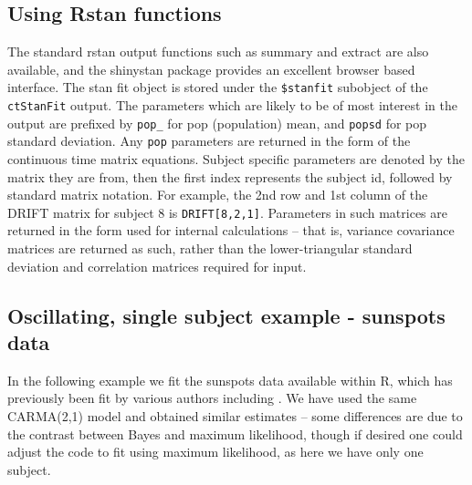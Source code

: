 \documentclass[11pt]{article}\usepackage[]{graphicx}\usepackage[]{color}
\begin{document}
{{{\subsection{Using Rstan functions}
The standard rstan output functions such as summary and extract are also available, and the shinystan package provides an excellent browser based interface. The stan fit object is stored under the \verb|$stanfit| subobject of the \verb|ctStanFit| output. The parameters which are likely to be of most interest in the output are prefixed by \verb|pop_| for pop (population) mean, and \verb|popsd| for pop standard deviation. Any \verb|pop| parameters are returned in the form of the continuous time matrix equations. Subject specific parameters are denoted by the matrix they are from, then the first index represents the subject id, followed by standard matrix notation. For example, the 2nd row and 1st column of the DRIFT matrix for subject 8 is \verb|DRIFT[8,2,1]|. Parameters in such matrices are returned in the form used for internal calculations -- that is, variance covariance matrices are returned as such, rather than the lower-triangular standard deviation and correlation matrices required for input. 


\subsection{Oscillating, single subject example - sunspots data}
In the following example we fit the sunspots data available within R, which has previously been fit by various authors including \citet{tomasson2013computational}. We have used the same CARMA(2,1) model and obtained similar estimates -- some differences are due to the contrast between Bayes and maximum likelihood, though if desired one could adjust the code to fit using maximum likelihood, as here we have only one subject. 



}}}
\end{document}
